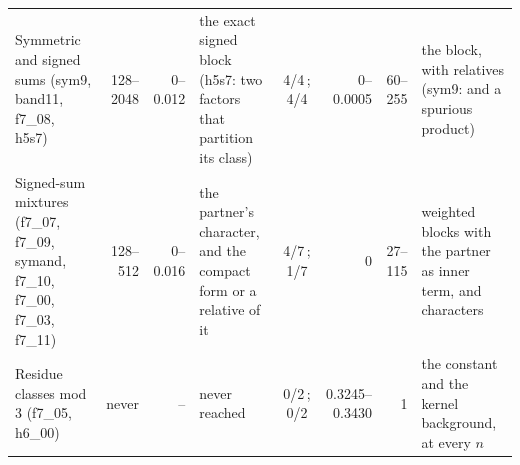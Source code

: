 \begin{tabularx}{\linewidth}{@{}>{\raggedright\arraybackslash}p{2.35cm}rr>{\raggedright\arraybackslash}Xcrr>{\raggedright\arraybackslash}X@{}}
Symmetric and signed sums (sym9, band11, f7\_08, h5s7) & 128--2048 & 0--0.012 & the exact signed block (h5s7: two factors that partition its class) & 4/4\,; 4/4 & 0--0.0005 & 60--255 & the block, with relatives (sym9: and a spurious product)\\
Signed-sum mixtures (f7\_07, f7\_09, symand, f7\_10, f7\_00, f7\_03, f7\_11) & 128--512 & 0--0.016 & the partner's character, and the compact form or a relative of it & 4/7\,; 1/7 & 0 & 27--115 & weighted blocks with the partner as inner term, and characters\\
Residue classes mod 3 (f7\_05, h6\_00) & never & -- & never reached & 0/2\,; 0/2 & 0.3245--0.3430 & 1 & the constant and the kernel background, at every $n$\\
\bottomrule
\end{tabularx}
